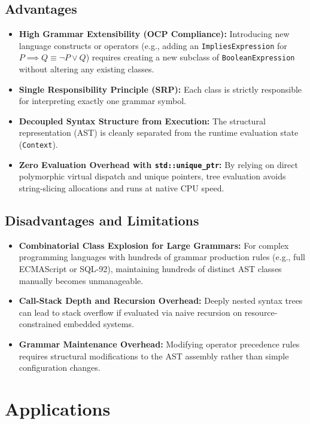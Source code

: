 \documentclass[12pt,a4paper]{article}
\begin{document}
\subsection{Advantages}
\begin{itemize}
    \item \textbf{High Grammar Extensibility (OCP Compliance):} Introducing new language constructs or operators (e.g., adding an \texttt{ImpliesExpression} for $P \implies Q \equiv \neg P \lor Q$) requires creating a new subclass of \texttt{BooleanExpression} without altering any existing classes.
    \item \textbf{Single Responsibility Principle (SRP):} Each class is strictly responsible for interpreting exactly one grammar symbol.
    \item \textbf{Decoupled Syntax Structure from Execution:} The structural representation (AST) is cleanly separated from the runtime evaluation state (\texttt{Context}).
    \item \textbf{Zero Evaluation Overhead with \texttt{std::unique\_ptr}:} By relying on direct polymorphic virtual dispatch and unique pointers, tree evaluation avoids string-slicing allocations and runs at native CPU speed.
\end{itemize}

\subsection{Disadvantages and Limitations}
\begin{itemize}
    \item \textbf{Combinatorial Class Explosion for Large Grammars:} For complex programming languages with hundreds of grammar production rules (e.g., full ECMAScript or SQL-92), maintaining hundreds of distinct AST classes manually becomes unmanageable.
    \item \textbf{Call-Stack Depth and Recursion Overhead:} Deeply nested syntax trees can lead to stack overflow if evaluated via naive recursion on resource-constrained embedded systems.
    \item \textbf{Grammar Maintenance Overhead:} Modifying operator precedence rules requires structural modifications to the AST assembly rather than simple configuration changes.
\end{itemize}

\section{Applications}
\end{document}
